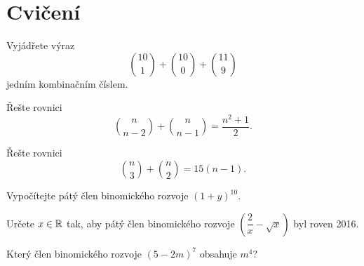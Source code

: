 \section{Cvičení}

\begin{exercise}\label{exercise:ch03_1}
    Vyjádřete výraz
    \[\binom{10}{1}+\binom{10}{0}+\binom{11}{9}\]
    jedním kombinačním číslem.
\end{exercise}
\begin{exercise}\label{exercise:ch03_2}
    Řešte rovnici
    \[\binom{n}{n-2}+\binom{n}{n-1}=\dfrac{n^2+1}{2}.\]
\end{exercise}
\begin{exercise}\label{exercise:ch03_3}
    Řešte rovnici
    \[\binom{n}{3}+\binom{n}{2}=15(n-1).\]
\end{exercise}
\begin{exercise}\label{exercise:ch03_4}
    Vypočítejte pátý člen binomického rozvoje $(1+y)^{10}$.
\end{exercise}
\begin{exercise}\label{exercise:ch03_5}
    Určete $x\in\mathbb{R}$ tak, aby pátý člen binomického rozvoje $\displaystyle\left(\dfrac{2}{x}-\sqrt{x}\right)$ byl roven 2016.
\end{exercise}
\begin{exercise}\label{exercise:ch03_6}
    Který člen binomického rozvoje $(5-2m)^7$ obsahuje $m^4$?
\end{exercise}